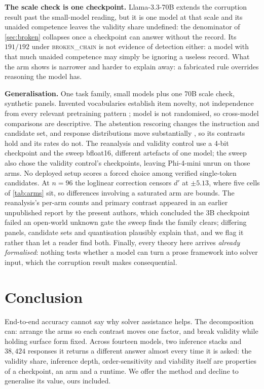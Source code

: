 \documentclass{article}
\begin{document}
\textbf{The scale check is one checkpoint.} Llama-3.3-70B extends the corruption
result past the small-model reading, but it is one model at that scale and its
unaided competence leaves the validity share undefined: the denominator of \cref{sec:broken} collapses once a checkpoint can
answer without the record. Its $191/192$ under \textsc{broken\_chain} is not
evidence of detection either: a model with that much unaided competence may
simply be ignoring a useless record. What the
arm shows is narrower and harder to explain away: a fabricated rule overrides
reasoning the model has.

\textbf{Generalisation.} One task family, small models plus one 70B scale check,
synthetic panels.
Invented vocabularies establish item novelty, not independence from every
relevant pretraining pattern \citep{golchin2023time,deng2024investigating};
model is not randomised, so cross-model comparisons are descriptive. The
abstention rescoring changes the instruction and candidate set, and response
distributions move substantially \citep{zhao2021calibrate,zheng2023large}, so
its contrasts hold and its rates do not. The reanalysis and validity
control use a 4-bit checkpoint and the sweep bfloat16, different artefacts of one
model; the sweep also chose the validity control's checkpoints, leaving
Phi-4-mini unrun on those arms. No deployed setup scores a forced
choice among verified single-token candidates. At $n = 96$ the
loglinear correction censors $d'$ at $\pm 5.13$, where five cells of
\cref{tab:arms} sit, so differences involving a saturated arm are bounds. The
reanalysis's per-arm counts and primary contrast appeared in an earlier
unpublished report by the present authors, which concluded the 3B checkpoint
failed an open-world unknown gate the sweep finds the family clears; differing
panels, candidate sets and quantisation plausibly explain that, and we flag it
rather than let a reader find both. Finally, every theory here arrives
\emph{already formalised}: nothing tests whether a model can turn a prose
framework into solver input, which the corruption result makes consequential.

\section{Conclusion}

End-to-end accuracy cannot say why solver assistance helps. The decomposition
can: arrange the arms so each contrast moves one factor, and break validity
while holding surface form fixed. Across fourteen models, two inference stacks and
$38{,}424$ responses it returns a different answer almost every time it
is asked: the validity share, inference depth, order-sensitivity and viability
itself are properties of a checkpoint, an arm and a runtime. We offer the method
and decline to generalise its value, ours included.
\end{document}
